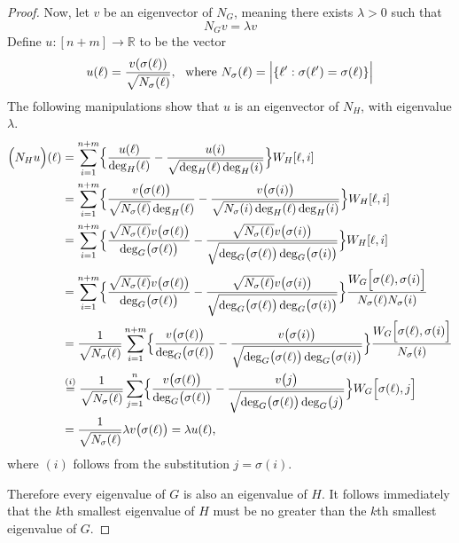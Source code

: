 \documentclass{article}
\newcommand{\Reals}{\mathbb{R}}
\newcommand{\1}{\mathbf{1}}
\theoremstyle{alden}
\theoremstyle{aldenthm}
\theoremstyle{definition}
\theoremstyle{remark}
\begin{document}
\begin{proof}
	
	Now, let $v$ be an eigenvector of $N_G$, meaning there exists $\lambda > 0$ such that
	\begin{equation*}
	N_G v = \lambda v
	\end{equation*}
	Define $u: [n + m] \to \Reals$ to be the vector
	\begin{equation*}
	u(\ell) = \frac{v(\sigma(\ell))}{\sqrt{N_{\sigma}(\ell)}},~~\textrm{where $N_{\sigma}(\ell) = \Bigl|\{\ell':\sigma(\ell') = \sigma(\ell)\}\Bigr|$}
	\end{equation*}
	The following manipulations show that $u$ is an eigenvector of $N_H$, with eigenvalue $\lambda$. 
	\begin{align*}
	\Bigl(N_H u\Bigr)(\ell) & = \sum_{i = 1}^{n + m} \Bigl\{ \frac{u(\ell)}{\deg_H(\ell)} - \frac{u(i)}{\sqrt{\deg_H(\ell) \deg_H(i)}} \Bigr\} W_{H}[\ell,i] \\
	 & = \sum_{i = 1}^{n + m} \Bigl\{ \frac{v\bigl(\sigma(\ell)\bigr)}{\sqrt{N_{\sigma}(\ell)}\deg_H(\ell)} - \frac{v\bigl(\sigma(i)\bigr)}{\sqrt{N_{\sigma}(i)\deg_H(\ell) \deg_H(i)}} \Bigr\} W_{H}[\ell,i] \\
	& = \sum_{i = 1}^{n + m} \Bigl\{ \frac{\sqrt{N_{\sigma}(\ell)} v\bigl(\sigma(\ell)\bigr)}{\deg_G\bigl(\sigma(\ell)\bigr)} - \frac{\sqrt{N_{\sigma}(\ell)} v\bigl(\sigma(i)\bigr)}{\sqrt{\deg_G\bigl(\sigma(\ell)\bigr) \deg_G\bigl(\sigma(i)\bigr)}} \Bigr\} W_{H}[\ell,i]  \\
	& = \sum_{i = 1}^{n + m} \Bigl\{ \frac{\sqrt{N_{\sigma}(\ell)} v\bigl(\sigma(\ell)\bigr)}{\deg_G\bigl(\sigma(\ell)\bigr)} - \frac{\sqrt{N_{\sigma}(\ell)} v\bigl(\sigma(i)\bigr)}{\sqrt{\deg_G\bigl(\sigma(\ell)\bigr) \deg_G\bigl(\sigma(i)\bigr)}} \Bigr\} \frac{W_{G}\Bigl[\sigma(\ell),\sigma(i)\Bigr]}{N_{\sigma}(\ell) N_{\sigma}(i)} \\
	& = \frac{1}{\sqrt{N_{\sigma}(\ell)}}\sum_{i = 1}^{n + m} \Bigl\{ \frac{ v\bigl(\sigma(\ell)\bigr)}{\deg_G\bigl(\sigma(\ell)\bigr)} - \frac{ v\bigl(\sigma(i)\bigr)}{\sqrt{\deg_G\bigl(\sigma(\ell)\bigr) \deg_G\bigl(\sigma(i)\bigr)}} \Bigr\} \frac{W_{G}\Bigl[\sigma(\ell),\sigma(i)\Bigr]}{N_{\sigma}(i)} \\
	& \overset{(i)}{=} \frac{1}{\sqrt{N_{\sigma}(\ell)}}\sum_{j = 1}^{n} \Bigl\{ \frac{ v\bigl(\sigma(\ell)\bigr)}{\deg_G\bigl(\sigma(\ell)\bigr)} - \frac{ v\bigl(j\bigr)}{\sqrt{\deg_G\bigl(\sigma(\ell)\bigr) \deg_G\bigl(j\bigr)}} \Bigr\} W_{G}\Bigl[\sigma(\ell),j\Bigr] \\
	& = \frac{1}{\sqrt{N_{\sigma}(\ell)}} \lambda v\bigl(\sigma(\ell)\bigr) = \lambda u(\ell),
	\end{align*}
	where $(i)$ follows from the substitution $j = \sigma(i)$.
	
	Therefore every eigenvalue of $G$ is also an eigenvalue of $H$. It follows immediately that the $k$th smallest eigenvalue of $H$ must be no greater than the $k$th smallest eigenvalue of $G$.
\end{proof}
\end{document}
